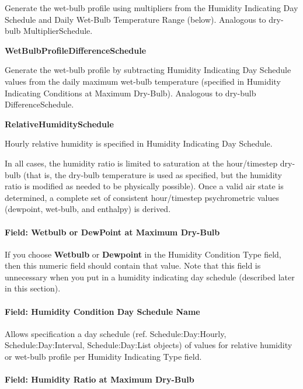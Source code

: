 Generate the wet-bulb profile using multipliers from the Humidity Indicating Day Schedule and Daily Wet-Bulb Temperature Range (below). Analogous to dry-bulb MultiplierSchedule.

\textbf{WetBulbProfileDifferenceSchedule}

Generate the wet-bulb profile by subtracting Humidity Indicating Day Schedule values from the daily maximum wet-bulb temperature (specified in Humidity Indicating Conditions at Maximum Dry-Bulb). Analogous to dry-bulb DifferenceSchedule.

\textbf{RelativeHumiditySchedule}

Hourly relative humidity is specified in Humidity Indicating Day Schedule.

In all cases, the humidity ratio is limited to saturation at the hour/timestep dry-bulb (that is, the dry-bulb temperature is used as specified, but the humidity ratio is modified as needed to be physically possible). Once a valid air state is determined, a complete set of consistent hour/timestep psychrometric values (dewpoint, wet-bulb, and enthalpy) is derived.

\paragraph{Field: Wetbulb or DewPoint at Maximum Dry-Bulb}\label{field-wetbulb-or-dewpoint-at-maximum-dry-bulb}

If you choose \textbf{Wetbulb} or \textbf{Dewpoint} in the Humidity Condition Type field, then this numeric field should contain that value. Note that this field is unnecessary when you put in a humidity indicating day schedule (described later in this section).

\paragraph{Field: Humidity Condition Day Schedule Name}\label{field-humidity-condition-day-schedule-name}

Allows specification a day schedule (ref. Schedule:Day:Hourly, Schedule:Day:Interval, Schedule:Day:List objects) of values for relative humidity or wet-bulb profile per Humidity Indicating Type field.

\paragraph{Field: Humidity Ratio at Maximum Dry-Bulb}\label{field-humidity-ratio-at-maximum-dry-bulb}

